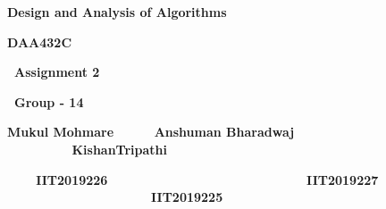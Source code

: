 \documentclass[letterpaper]{article}
\title{}
\author{}
\date{2021-04-13}
\begin{document}
\clearpage\setcounter{page}{1}\pagestyle{Standard}
{\centering\bfseries
Design and Analysis of Algorithms
\par}

{\centering\bfseries
DAA432C
\par}

{\centering\bfseries
\ Assignment 2 
\par}

{\centering\bfseries
\ Group - 14 
\par}

{\centering\bfseries
Mukul Mohmare \ \ \ \ \ Anshuman Bharadwaj \ \ \ \ \ \ \ \ \ KishanTripathi
\par}

{\centering\bfseries
\ \ \ \ IIT2019226 \ \ \ \ \ \ \ \ \ \ \ \ \ \ \ \ \ \ \ \ \ \ \ \ \ \ \ IIT2019227
\ \ \ \ \ \ \ \ \ \ \ \ \ \ \ \ \ \ \ \ IIT2019225
\par}


\bigskip
\end{document}
